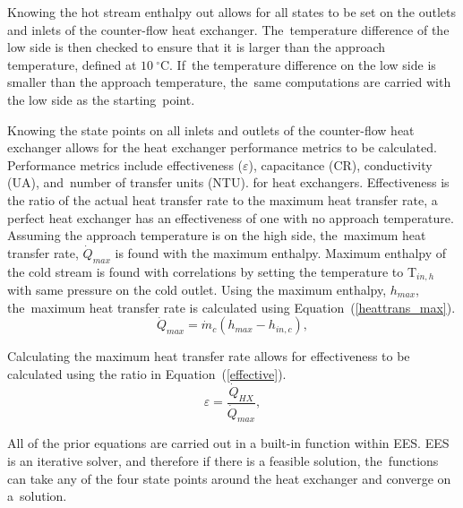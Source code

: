 \documentclass[sustainability,article,accept,moreauthors,pdftex]{Definitions/mdpi}
\begin{document}
Knowing the hot stream enthalpy out allows for all states to be set on the outlets and inlets of the counter-flow heat exchanger. The~temperature difference of the low side is then checked to ensure that it is larger than the approach temperature, defined at $10~^\circ$C. If~the temperature difference on the low side is smaller than the approach temperature, the~same computations are carried with the low side as the starting~point.

Knowing the state points on all inlets and outlets of the counter-flow heat exchanger allows for the heat exchanger performance metrics to be calculated. Performance metrics include %
{effectiveness ($\varepsilon$), capacitance (CR), conductivity (UA), and~number of transfer units (NTU).}
for heat exchangers. Effectiveness is the ratio of the actual heat transfer rate to the maximum heat transfer rate, %
{a perfect heat exchanger has an effectiveness of one}
with no approach temperature. Assuming the approach temperature is on the high side, the~maximum heat transfer rate, $\dot{Q}_{max}$ is found with the maximum enthalpy. Maximum enthalpy of the cold stream is found with correlations by setting the temperature to T$_{in,h}$ with same pressure on the cold outlet. Using the maximum enthalpy, $h_{max}$, the~maximum heat transfer rate is calculated using Equation~(\ref{heattrans_max}).
\begin{equation}
    \label{heattrans_max}
    \dot{Q}_{max} = \dot{m}_{c}(h_{max}-h_{in,c}),
\end{equation}

Calculating the maximum heat transfer rate allows for effectiveness to be calculated using the ratio in Equation~(\ref{effective}).
\begin{equation}
    \label{effective}
    \varepsilon = \frac{\dot{Q}_{HX}}{\dot{Q}_{max}},
\end{equation}

All of the prior equations are carried out in a built-in function within EES. EES is an iterative solver, and therefore if there is a feasible solution, the~functions can take any of the four state points around the heat exchanger and converge on a~solution.
\end{document}
